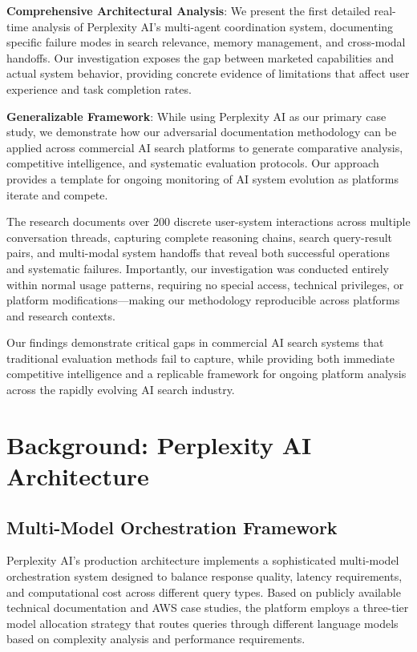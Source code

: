 \documentclass[12pt]{article}
\begin{document}
\textbf{Comprehensive Architectural Analysis}: We present the first detailed real-time analysis of Perplexity AI's multi-agent coordination system, documenting specific failure modes in search relevance, memory management, and cross-modal handoffs. Our investigation exposes the gap between marketed capabilities and actual system behavior, providing concrete evidence of limitations that affect user experience and task completion rates.

\textbf{Generalizable Framework}: While using Perplexity AI as our primary case study, we demonstrate how our adversarial documentation methodology can be applied across commercial AI search platforms to generate comparative analysis, competitive intelligence, and systematic evaluation protocols. Our approach provides a template for ongoing monitoring of AI system evolution as platforms iterate and compete.

The research documents over 200 discrete user-system interactions across multiple conversation threads, capturing complete reasoning chains, search query-result pairs, and multi-modal system handoffs that reveal both successful operations and systematic failures. Importantly, our investigation was conducted entirely within normal usage patterns, requiring no special access, technical privileges, or platform modifications—making our methodology reproducible across platforms and research contexts.

Our findings demonstrate critical gaps in commercial AI search systems that traditional evaluation methods fail to capture, while providing both immediate competitive intelligence and a replicable framework for ongoing platform analysis across the rapidly evolving AI search industry.


\section{Background: Perplexity AI Architecture}

\subsection{Multi-Model Orchestration Framework}

Perplexity AI's production architecture implements a sophisticated multi-model orchestration system designed to balance response quality, latency requirements, and computational cost across different query types. Based on publicly available technical documentation and AWS case studies, the platform employs a three-tier model allocation strategy that routes queries through different language models based on complexity analysis and performance requirements.
\end{document}

